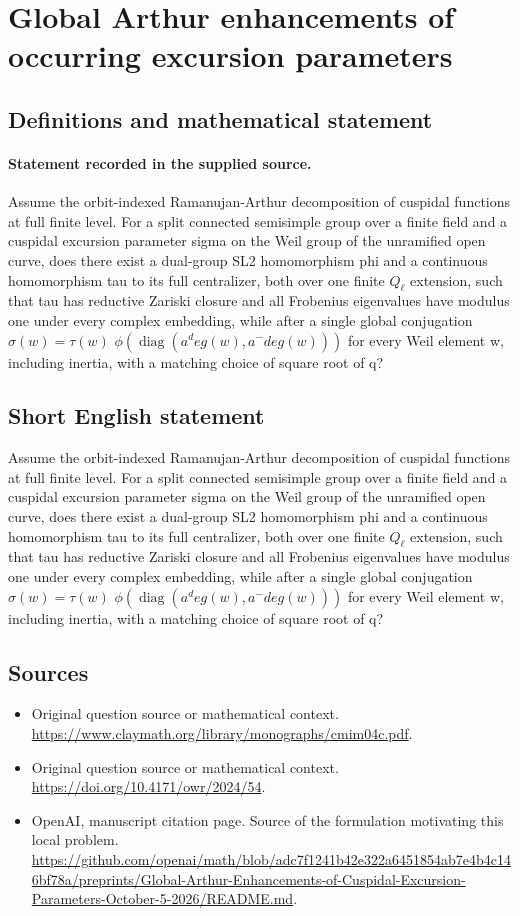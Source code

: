 \documentclass[11pt]{article}
\begin{document}
\section*{Global Arthur enhancements of occurring excursion parameters}\label{statement}
\subsection{Definitions and mathematical statement}
\paragraph{Statement recorded in the supplied source.}
Assume the orbit-indexed Ramanujan-Arthur decomposition of cuspidal functions at full finite level. For a split connected semisimple group over a finite field and a cuspidal excursion parameter sigma on the Weil group of the unramified open curve, does there exist a dual-group SL2 homomorphism phi and a continuous homomorphism tau to its full centralizer, both over one finite $Q_\ell $ extension, such that tau has reductive Zariski closure and all Frobenius eigenvalues have modulus one under every complex embedding, while after a single global conjugation $\sigma (w)=\tau (w)$ $\phi (\operatorname{diag}(a^deg(w),a^-deg(w)))$ for every Weil element w, including inertia, with a matching choice of square root of q?
\subsection{Short English statement}
Assume the orbit-indexed Ramanujan-Arthur decomposition of cuspidal functions at full finite level. For a split connected semisimple group over a finite field and a cuspidal excursion parameter sigma on the Weil group of the unramified open curve, does there exist a dual-group SL2 homomorphism phi and a continuous homomorphism tau to its full centralizer, both over one finite $Q_\ell $ extension, such that tau has reductive Zariski closure and all Frobenius eigenvalues have modulus one under every complex embedding, while after a single global conjugation $\sigma (w)=\tau (w)$ $\phi (\operatorname{diag}(a^deg(w),a^-deg(w)))$ for every Weil element w, including inertia, with a matching choice of square root of q?
\subsection{Sources}
\begin{itemize}
\item[S1] Original question source or mathematical context.
\url{https://www.claymath.org/library/monographs/cmim04c.pdf}.
\item[S2] Original question source or mathematical context.
\url{https://doi.org/10.4171/owr/2024/54}.
\item[S3] OpenAI, manuscript citation page. Source of the formulation motivating this local problem.
\url{https://github.com/openai/math/blob/adc7f1241b42e322a6451854ab7e4b4c146bf78a/preprints/Global-Arthur-Enhancements-of-Cuspidal-Excursion-Parameters-October-5-2026/README.md}.
\end{itemize}
\end{document}

